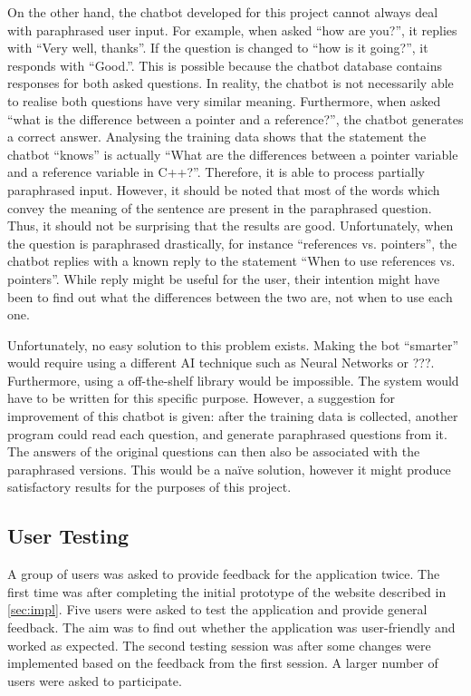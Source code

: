 \documentclass[12pt,a4paper]{article}
\begin{document}
On the other hand, the chatbot developed for this project cannot always deal with paraphrased user input. For example, when asked “how are you?”, it replies with “Very well, thanks”. If the question is changed to “how is it going?”, it responds with “Good.”. This is possible because the chatbot database contains responses for both asked questions. In reality, the chatbot is not necessarily able to realise both questions have very similar meaning. Furthermore, when asked “what is the difference between a pointer and a reference?”, the chatbot generates a correct answer. Analysing the training data shows that the statement the chatbot “knows” is actually “What are the differences between a pointer variable and a reference variable in C++?”. Therefore, it is able to process partially paraphrased input. However, it should be noted that most of the words which convey the meaning of the sentence are present in the paraphrased question. Thus, it should not be surprising that the results are good. Unfortunately, when the question is paraphrased drastically, for instance “references vs. pointers”, the chatbot replies with a known reply to the statement “When to use references vs. pointers”. While reply might be useful for the user, their intention might have been to find out what the differences between the two are, not when to use each one.

Unfortunately, no easy solution to this problem exists. Making the bot “smarter” would require using a different AI technique such as Neural Networks or ???. Furthermore, using a off-the-shelf library would be impossible. The system would have to be written for this specific purpose. However, a suggestion for improvement of this chatbot is given: after the training data is collected, another program could read each question, and generate paraphrased questions from it. The answers of the original questions can then also be associated with the paraphrased versions. This would be a naïve solution, however it might produce satisfactory results for the purposes of this project.


\subsection{User Testing}
A group of users was asked to provide feedback for the application twice. The first time was after completing the initial prototype of the website described in \cref{sec:impl}. Five users were asked to test the application and provide general feedback. The aim was to find out whether the application was user-friendly and worked as expected. The second testing session was after some changes were implemented based on the feedback from the first session. A larger number of users were asked to participate.
\end{document}
